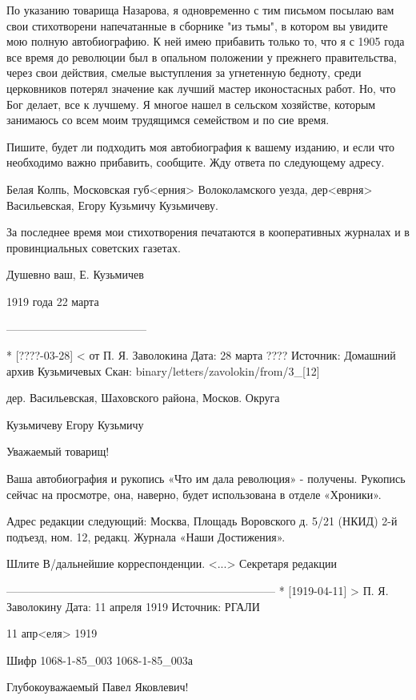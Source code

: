 По указанию товарища Назарова, я одновременно с тим письмом посылаю вам свои стихотворени напечатанные в сборнике "из тьмы", в котором вы увидите мою полную автобиографию. К ней имею прибавить только то, что я с 1905 года все время до революции был в опальном положении у прежнего правительства, через свои действия, смелые выступления за угнетенную бедноту, среди церковников потерял значение как лучший мастер иконостасных работ. Но, что Бог делает, все к лучшему. Я многое нашел в сельском хозяйстве, которым занимаюсь со всем моим трудящимся семейством и по сие время.

Пишите, будет ли подходить моя автобиография к вашему изданию, и если что необходимо важно прибавить, сообщите. Жду ответа по следующему адресу.

Белая Колпь, Московская губ<ерния> Волоколамского уезда, дер<еврня> Васильевская, Егору Кузьмичу Кузьмичеву.

За последнее время мои стихотворения печатаются в кооперативных журналах и в провинциальных советских газетах.

Душевно ваш, Е. Кузьмичев

1919 года 22 марта

--------------------------------------

* [????-03-28] < от П. Я. Заволокина 
Дата: 28 марта ????
Источник: Домашний архив Кузьмичевых
Скан: binary/letters/zavolokin/from/3_[12]

дер. Васильевская, Шаховского района, Москов. Округа

Кузьмичеву Егору Кузьмичу

Уважаемый товарищ!

Ваша автобиография и рукопись «Что им дала революция» - получены. Рукопись сейчас на просмотре, она, наверно, будет использована в отделе «Хроники».

Адрес редакции следующий: Москва, Площадь Воровского д. 5/21 (НКИД) 2-й подъезд, ном. 12, редакц. Журнала «Наши Достижения».

Шлите В/дальнейшие корреспонденции.
<...> Секретаря редакции 

------------------------------------------------------------------------
* [1919-04-11] > П. Я. Заволокину 
Дата: 11 апреля 1919
Источник: РГАЛИ

11 апр<еля> 1919

Шифр    1068-1-85_003
        1068-1-85_003а

Глубокоуважаемый Павел Яковлевич!


